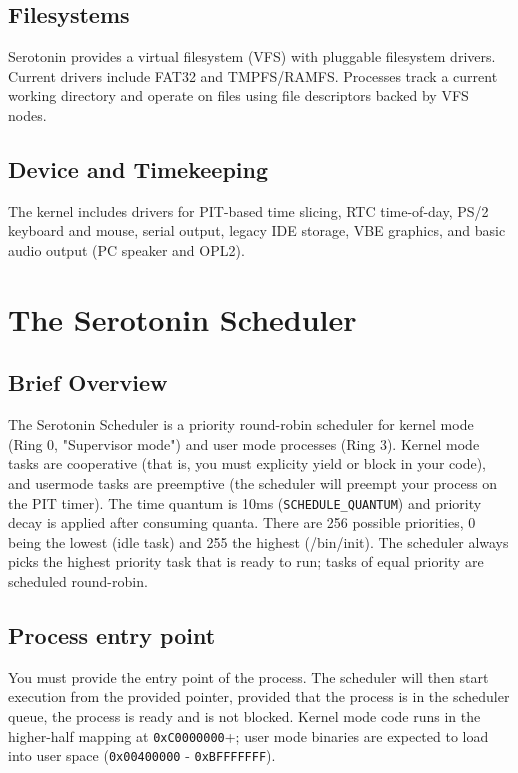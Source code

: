 \documentclass[11pt,a4paper]{article}
\begin{document}
\subsection{Filesystems}
Serotonin provides a virtual filesystem (VFS) with pluggable filesystem drivers. Current drivers include FAT32 and TMPFS/RAMFS. Processes track a current working directory and operate on files using file descriptors backed by VFS nodes.

\subsection{Device and Timekeeping}
The kernel includes drivers for PIT-based time slicing, RTC time-of-day, PS/2 keyboard and mouse, serial output, legacy IDE storage, VBE graphics, and basic audio output (PC speaker and OPL2).

\section{The Serotonin Scheduler}

\subsection{Brief Overview}
The Serotonin Scheduler is a priority round-robin scheduler for kernel mode (Ring 0, "Supervisor mode") and user mode processes (Ring 3). Kernel mode tasks are cooperative (that is, you must explicity yield or block in your code), and usermode tasks are preemptive (the scheduler will preempt your process on the PIT timer). The time quantum is 10ms (\texttt{SCHEDULE\_QUANTUM}) and priority decay is applied after consuming quanta. There are 256 possible priorities, 0 being the lowest (idle task) and 255 the highest (/bin/init). The scheduler always picks the highest priority task that is ready to run; tasks of equal priority are scheduled round-robin.

\subsection{Process entry point}
You must provide the entry point of the process. The scheduler will then start execution from the provided pointer, provided that the process is in the scheduler queue, the process is ready and is not blocked. Kernel mode code runs in the higher-half mapping at \texttt{0xC0000000}+; user mode binaries are expected to load into user space (\texttt{0x00400000} - \texttt{0xBFFFFFFF}).
\end{document}

